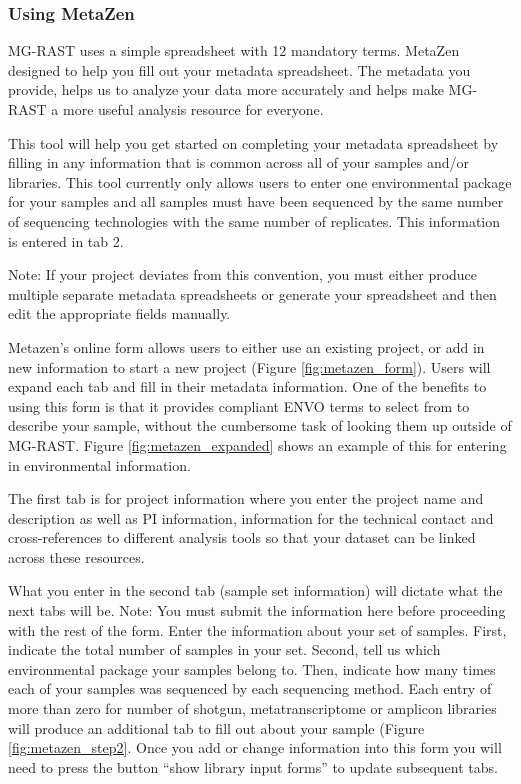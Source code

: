 \documentclass[12pt,fullpage]{report}
\begin{document}
\subsubsection*{Using MetaZen}
\label{section:using_metazen}

MG-RAST uses a simple spreadsheet with 12 mandatory terms. MetaZen designed to help you fill out your metadata spreadsheet. The metadata you provide, helps us to analyze your data more accurately and helps make MG-RAST a more useful analysis resource for everyone.

This tool will help you get started on completing your metadata spreadsheet by filling in any information that is common across all of your samples and/or libraries. This tool currently only allows users to enter one environmental package for your samples and all samples must have been sequenced by the same number of sequencing technologies with the same number of replicates. This information is entered in tab 2.

Note: If your project deviates from this convention, you must either produce multiple separate metadata spreadsheets or generate your spreadsheet and then edit the appropriate fields manually.

Metazen’s online form allows users to either use an existing project, or add in new information to start a new project (Figure \ref{fig:metazen_form}).  Users will expand each tab and fill in their metadata information. One of the benefits to using this form is that it provides compliant ENVO terms to select from to describe your sample, without the cumbersome task of looking them up outside of MG-RAST. Figure \ref{fig:metazen_expanded} shows an example of this for entering in environmental information.

The first tab is for project information where you enter the project name and description as well as PI information, information for the technical contact and cross-references to different analysis tools so that your dataset can be linked across these resources.

What you enter in the second tab (sample set information) will dictate what the next tabs will be.
Note: You must submit the information here before proceeding with the rest of the form.
Enter the information about your set of samples. First, indicate the total number of samples in your set. Second, tell us which environmental package your samples belong to. Then, indicate how many times each of your samples was sequenced by each sequencing method.  Each entry of more than zero for number of shotgun, metatranscriptome or amplicon libraries will produce an additional tab to fill out about your sample (Figure \ref{fig:metazen_step2}.  Once you add or change information into this form you will need to press the button “show library input forms” to update subsequent tabs.
\end{document}
